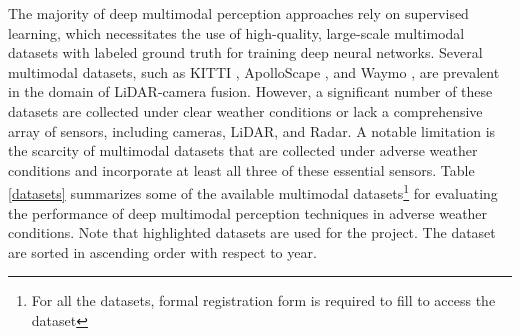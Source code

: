\documentclass[report.tex]{subfiles}
\begin{document}



    The majority of deep multimodal perception approaches rely on supervised learning, which necessitates the use of high-quality, large-scale multimodal datasets with labeled ground truth for training deep neural networks. Several multimodal datasets, such as KITTI \cite{geiger2012we}, ApolloScape \cite{huang2019apolloscape}, and Waymo \cite{sun2020scalability}, are prevalent in the domain of LiDAR-camera fusion. However, a significant number of these datasets are collected under clear weather conditions or lack a comprehensive array of sensors, including cameras, LiDAR, and Radar. A notable limitation is the scarcity of multimodal datasets that are collected under adverse weather conditions and incorporate at least all three of these essential sensors. Table \ref{datasets} summarizes some of the available multimodal datasets\footnote{For all the datasets, formal registration form is required to fill to access the dataset} for evaluating the performance of deep multimodal perception techniques in adverse weather conditions. Note that highlighted datasets are used for the project. The dataset are sorted in ascending order with respect to year.
    
\end{document}

